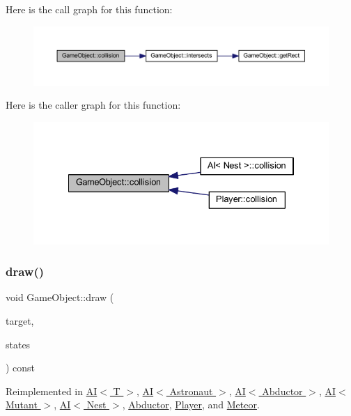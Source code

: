 Here is the call graph for this function\+:
\nopagebreak
\begin{figure}[H]
\begin{center}
\leavevmode
\includegraphics[width=350pt]{class_game_object_a56a330813f51b91b2ad8aacb42b6d8ea_cgraph}
\end{center}
\end{figure}
Here is the caller graph for this function\+:
\nopagebreak
\begin{figure}[H]
\begin{center}
\leavevmode
\includegraphics[width=334pt]{class_game_object_a56a330813f51b91b2ad8aacb42b6d8ea_icgraph}
\end{center}
\end{figure}
\mbox{\label{class_game_object_aa6d7650a920e2dd79b0125560faf3807}} 
\subsubsection{\texorpdfstring{draw()}{draw()}}
{\footnotesize\ttfamily void Game\+Object\+::draw (\begin{DoxyParamCaption}\item[{sf\+::\+Render\+Target \&}]{target,  }\item[{sf\+::\+Render\+States}]{states }\end{DoxyParamCaption}) const\hspace{0.3cm}{\ttfamily [virtual]}}



Reimplemented in \hyperlink{class_a_i_a8a7423a8612cfd777f3b5eeae4764d50}{A\+I$<$ T $>$}, \hyperlink{class_a_i_a8a7423a8612cfd777f3b5eeae4764d50}{A\+I$<$ Astronaut $>$}, \hyperlink{class_a_i_a8a7423a8612cfd777f3b5eeae4764d50}{A\+I$<$ Abductor $>$}, \hyperlink{class_a_i_a8a7423a8612cfd777f3b5eeae4764d50}{A\+I$<$ Mutant $>$}, \hyperlink{class_a_i_a8a7423a8612cfd777f3b5eeae4764d50}{A\+I$<$ Nest $>$}, \hyperlink{class_abductor_aebaf5c5a2882f41c8e1ed1b18f80e3d1}{Abductor}, \hyperlink{class_player_a0ca934f76860c378cd991a8a32f27edd}{Player}, and \hyperlink{class_meteor_a7fdbe8bd5027df6ae82e0d6391ec2b8d}{Meteor}.

